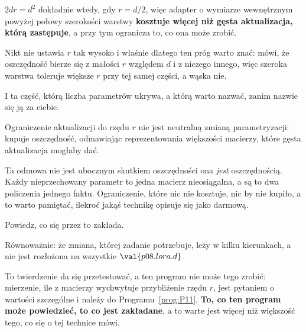\begin{fr}
$2dr = d^{2}$ dokładnie wtedy, gdy $r = d/2$, więc adapter o wymiarze
wewnętrznym powyżej połowy szerokości warstwy \textbf{kosztuje więcej niż gęsta
aktualizacja, którą zastępuje}, a przy tym ogranicza to, co ona może zrobić.

Nikt nie ustawia $r$ tak wysoko i właśnie dlatego ten próg warto znać: mówi, że
oszczędność bierze się z małości $r$ względem $d$ i z niczego innego, więc
szeroka warstwa toleruje większe $r$ przy tej samej części, a wąska nie.
\end{fr}

\begin{fr}
I ta część, którą liczba parametrów ukrywa, a którą warto nazwać, zanim
nazwie się ją za ciebie.

Ograniczenie aktualizacji do rzędu $r$ nie jest neutralną zmianą
parametryzacji: kupuje oszczędność, odmawiając reprezentowania większości
macierzy, które gęsta aktualizacja mogłaby dać.

Ta odmowa nie jest ubocznym skutkiem oszczędności \dash{} ona \emph{jest}
oszczędnością. Każdy nieprzechowany parametr to jedna macierz nieosiągalna, a
są to dwa policzenia jednego faktu. Ograniczenie, które nic nie kosztuje, nic
by nie kupiło, a to warto pamiętać, ilekroć jakąś technikę opisuje się jako
darmową.

Powiedz, co się przez to zakłada.
\dotline
\nextframe
\end{fr}

\begin{fr}
Równoważnie: że zmiana, której zadanie potrzebuje, leży w kilku kierunkach, a
nie jest rozłożona na wszystkie $\val{p08.lora.d}$.

To twierdzenie da się przetestować, a ten program nie może tego zrobić:
mierzenie, ile z macierzy wychwytuje przybliżenie rzędu $r$, jest pytaniem o
wartości szczególne i należy do Programu~\ref{prog:P11}. \textbf{To, co ten
program może powiedzieć, to co jest zakładane}, a to warte jest więcej niż
większość tego, co się o tej technice mówi.
\end{fr}


